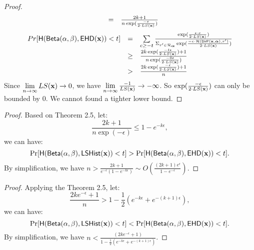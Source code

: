 \documentclass{article}
\begin{document}
\begin{proof}
\[\begin{array}{lcl}
 	& = &
 	\frac
  	{2k + 1}
	{n\exp(\frac{-\epsilon }{2\cdot LS(\textbf{x})})}
\end{array}
\]
\[
	\begin{array}{lcl}
	Pr[\mathsf{H}(\mathsf{Beta}(\alpha, \beta), \mathsf{EHD}(\textbf{x})) < t] 
	& =  & \sum\limits_{c \geq - t}
	\frac
  {\exp(\frac{\epsilon\cdot c}{2\cdot LS(\textbf{x})})}
{\Sigma_{r' \in \mathcal{R}_{\boldsymbol{\alpha}}}\exp(\frac{-\epsilon\cdot \mathcal{H}(\mathsf{DirP}(\textbf{x},\boldsymbol{\alpha}), r')}{2\cdot LS(\textbf{x})})}\\
 	& \geq &
 	\frac
  	{2k\exp(\frac{-t\epsilon }{2\cdot LS(\textbf{x})}) + 1}
	{n\exp(\frac{-0\epsilon }{2\cdot LS(\textbf{x})})}\\
 	& > &
 	\frac
  	{2k\exp(\frac{-\epsilon }{2\cdot LS(\textbf{x})}) + 1}
	{n}
\end{array}
\]
Since $\lim\limits_{n \rightarrow \infty} LS(\textbf{x}) \rightarrow 0$, 
we have $\lim\limits_{n \rightarrow \infty}\frac{-1}{LS(\textbf{x})} \rightarrow -\infty$. So $\exp(\frac{-\epsilon }{2\cdot LS(\textbf{x})})$ can only be bounded by $0$. We cannot found a tighter lower bound.
%
\end{proof}
%
%
\begin{proof}
Based on Theorem 2.5, let:
\[
	\frac
  	{2k+1}
	{n\exp(-\epsilon)} \leq 1 - e^{-k\epsilon},
\]
we can have:
\[
	\Pr[\mathsf{H}(\mathsf{Beta}(\alpha, \beta), \mathsf{LSHist}(\textbf{x}))< t]
	> 
	\Pr[\mathsf{H}(\mathsf{Beta}(\alpha, \beta), \mathsf{EHD}(\textbf{x}))< t].
\]
By simplification, we have $n > \frac{2k + 1}{e^{-\epsilon}(1 - e^{-k\epsilon})} \sim O(\frac{(2k + 1 )e^{\epsilon}}{1 - e^{-\epsilon}})$.
\end{proof}
%
%
%
%
\begin{proof}
Applying the Theorem 2.5, let:
\[
  \frac
    {2ke^{-\epsilon}+1}
  {n} > 1 - \frac{1}{2}(e^{-k\epsilon} + e^{-(k + 1)\epsilon}),
\]
we can have:
\[
  \Pr[\mathsf{H}(\mathsf{Beta}(\alpha, \beta), \mathsf{LSHist}(\textbf{x}))< t]
  <
  \Pr[\mathsf{H}(\mathsf{Beta}(\alpha, \beta), \mathsf{EHD}(\textbf{x}))< t].
\]
By simplification, we have $n < \frac{(2ke^{-\epsilon} + 1 )}{1 - \frac{1}{2}(e^{-k\epsilon} + e^{-(k + 1)\epsilon})}$.
\end{proof}
\end{document}
